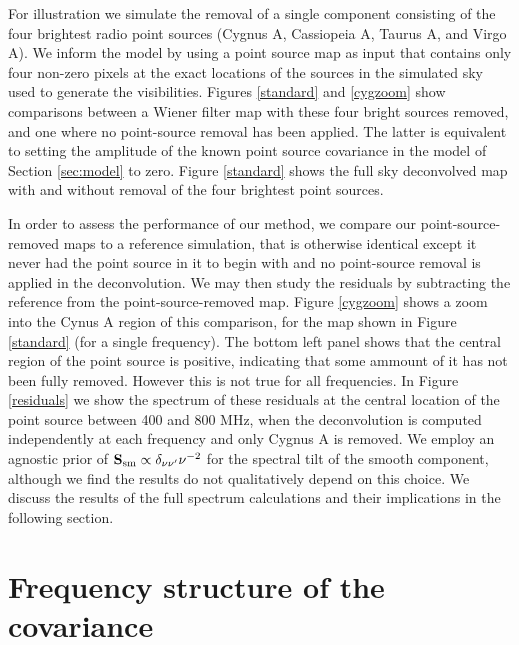 For illustration we simulate the removal of a single component consisting of the four brightest radio point sources (Cygnus A, Cassiopeia A, Taurus A, and Virgo A). We inform the model by using a point source map as input that contains only four non-zero pixels at the exact locations of the sources in the simulated sky used to generate the visibilities. Figures \ref{standard} and \ref{cygzoom} show comparisons between a Wiener filter map with these four bright sources removed, and one where no point-source removal has been applied. The latter is equivalent to setting the amplitude of the known point source covariance in the model of Section \ref{sec:model} to zero. Figure \ref{standard} shows the full sky deconvolved map with and without removal of the four brightest point sources. 

In order to assess the performance of our method, we compare our point-source-removed maps to a reference simulation, that is otherwise identical except it never had the point source in it to begin with and no point-source removal is applied in the deconvolution. We may then study the residuals by subtracting the reference from the point-source-removed map. Figure \ref{cygzoom} shows a zoom into the Cynus A region of this comparison, for the map shown in Figure \ref{standard} (for a single frequency). The bottom left panel shows that the central region of the point source is positive, indicating that some ammount of it has not been fully removed. However this is not true for all frequencies. In Figure \ref{residuals} we show the spectrum of these residuals at the central location of the point source between 400 and 800 MHz, when the deconvolution is computed independently at each frequency and only Cygnus A is removed. We employ an agnostic prior of $\mathbf{S}_{\rm sm} \propto \delta_{\nu\nu'}\nu^{-2}$ for the spectral tilt of the smooth component, although we find the results do not qualitatively depend on this choice. We discuss the results of the full spectrum calculations and their implications in the following section.


\section{Frequency structure of the covariance}
\label{sec:freq}

